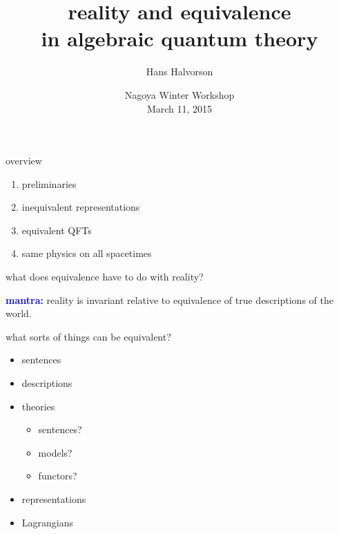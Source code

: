 \documentclass{beamer}
\title{reality and equivalence \\ in algebraic quantum theory}
\author{Hans Halvorson}
\date{Nagoya Winter Workshop \\ March 11, 2015}
\begin{document}
\begin{frame}

\maketitle

\end{frame}


\begin{frame}{overview}

\begin{enumerate}

\item preliminaries

\item inequivalent representations

\item equivalent QFTs

\item same physics on all spacetimes


\end{enumerate}



\end{frame}


\begin{frame}{what does equivalence have to do with reality?}

  \begin{centering} \textcolor{blue}{\bf mantra:} reality is invariant
    relative to equivalence of true descriptions of the
    world. \end{centering}





\end{frame}



\begin{frame}{what sorts of things can be equivalent?}

\begin{itemize}
\item sentences
\item descriptions
\item theories
\begin{itemize}
\item sentences?
\item models?
\item functors?
\end{itemize}
\item representations
\item Lagrangians

\end{itemize}


\end{frame}
\end{document}
